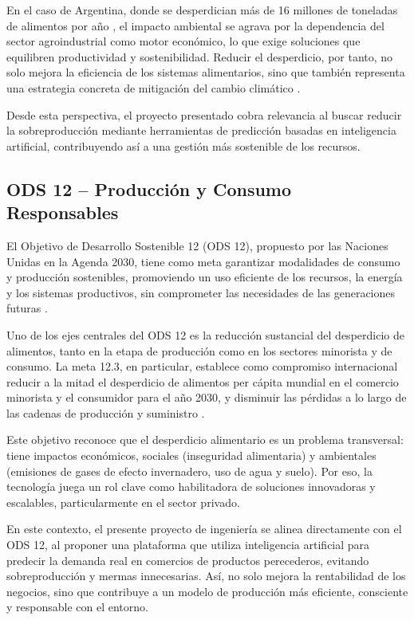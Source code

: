 En el caso de Argentina, donde se desperdician más de 16 millones de toneladas de alimentos por año \parencite{tiscornia2022}, el impacto ambiental se agrava por la dependencia del sector agroindustrial como motor económico, lo que exige soluciones que equilibren productividad y sostenibilidad. Reducir el desperdicio, por tanto, no solo mejora la eficiencia de los sistemas alimentarios, sino que también representa una estrategia concreta de mitigación del cambio climático \parencite{unep2021}.

Desde esta perspectiva, el proyecto presentado cobra relevancia al buscar reducir la sobreproducción mediante herramientas de predicción basadas en inteligencia artificial, contribuyendo así a una gestión más sostenible de los recursos.

\subsection{ODS 12 – Producción y Consumo Responsables}

El Objetivo de Desarrollo Sostenible 12 (ODS 12), propuesto por las Naciones Unidas en la Agenda 2030, tiene como meta garantizar modalidades de consumo y producción sostenibles, promoviendo un uso eficiente de los recursos, la energía y los sistemas productivos, sin comprometer las necesidades de las generaciones futuras \parencite{onu2015}.

Uno de los ejes centrales del ODS 12 es la reducción sustancial del desperdicio de alimentos, tanto en la etapa de producción como en los sectores minorista y de consumo. La meta 12.3, en particular, establece como compromiso internacional reducir a la mitad el desperdicio de alimentos per cápita mundial en el comercio minorista y el consumidor para el año 2030, y disminuir las pérdidas a lo largo de las cadenas de producción y suministro \parencite{unep2021}.

Este objetivo reconoce que el desperdicio alimentario es un problema transversal: tiene impactos económicos, sociales (inseguridad alimentaria) y ambientales (emisiones de gases de efecto invernadero, uso de agua y suelo). Por eso, la tecnología juega un rol clave como habilitadora de soluciones innovadoras y escalables, particularmente en el sector privado.

En este contexto, el presente proyecto de ingeniería se alinea directamente con el ODS 12, al proponer una plataforma que utiliza inteligencia artificial para predecir la demanda real en comercios de productos perecederos, evitando sobreproducción y mermas innecesarias. Así, no solo mejora la rentabilidad de los negocios, sino que contribuye a un modelo de producción más eficiente, consciente y responsable con el entorno.

